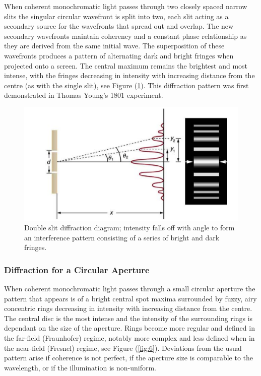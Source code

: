\documentclass[12pt]{article}
\begin{document}
When coherent monochromatic light passes through two closely spaced narrow slits the singular circular wavefront is split into two, each slit acting as a secondary source for the wavefronts that spread out and overlap.
The new secondary wavefronts maintain coherency and a constant phase relationship as they are derived from the same initial wave. The superposition of these wavefronts produces a pattern of alternating dark and bright fringes
when projected onto a screen. The central maximum remains the brightest and most intense, with the fringes decreasing in intensity with increasing distance from the centre (as with the single slit), see Figure (\ref{fig:5}). This diffraction pattern was first demonstrated in
Thomas Young's 1801 experiment. \cite{hecht2012optics,openstax3,10.11648/j.ajop.20190701.11}

\begin{figure}[H]
    \centering
    \includegraphics[width=.65\textwidth]{youngs slit.png}
    \caption{Double slit diffraction diagram; intensity falls off with angle to form an interference pattern consisting of a series of bright and dark fringes. \cite{openstax3}}
    \label{fig:5}
\end{figure}

\subsubsection{Diffraction for a Circular Aperture}

When coherent monochromatic light passes through a small circular aperture the pattern that appears is of a bright central spot maxima surrounded by fuzzy, airy concentric rings
decreasing in intensity with increasing distance from the centre. The central disc is the most intense and the intensity of the surrounding rings is dependant on the size of the aperture.
Rings become more regular and defined in the far-field (Fraunhofer) regime, notably more complex and less defined when in the near-field (Fresnel) regime, see Figure (\ref{fig:6}). Deviations from the usual pattern arise 
if coherence is not perfect, if the aperture size is comparable to the wavelength, or if the illumination is non-uniform. \cite{openstax3,andrews1947diffraction,burch1985fresnel,koushki2019diffraction}
\end{document}
